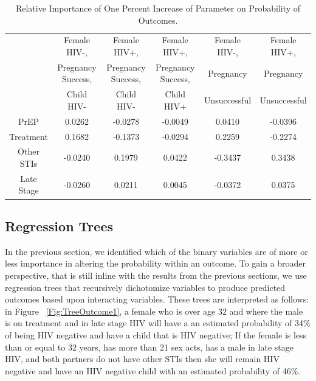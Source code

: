 \documentclass[11pt]{nih_mod}
\begin{document}
\begin{table}[H]	
\begin{center}
\begin{tabular}{|c|c|c|c|c|c|}
\hline
 & Female HIV-,  & Female HIV+, & Female HIV+, & Female HIV-, & Female HIV+,\\ 
 & Pregnancy Success,& Pregnancy Success,&Pregnancy Success,& Pregnancy& Pregnancy\\ 
 & Child HIV-&Child HIV-&Child HIV+&Unsuccessful&Unsuccessful\\ 
\hline
\hline
PrEP & 0.0262 & -0.0278 & -0.0049 & 0.0410 & -0.0396\\ 
Treatment & 0.1682 & -0.1373 & -0.0294 & 0.2259 & -0.2274\\
Other STIs &-0.0240 & 0.1979 & 0.0422 & -0.3437 & 0.3438\\
Late Stage & -0.0260 & 0.0211 & 0.0045 & -0.0372 & 0.0375\\
\hline
\end{tabular}
	\caption{Relative Importance of One Percent Increase of Parameter on Probability of Outcomes. \label{tab:OnePercentIncr}}
\end{center}
\end{table}


\subsection{Regression Trees}
In the previous section, we identified which of the binary variables are of more or less importance in altering the probability within an outcome.  To gain a broader perspective, that is still inline with the results from the previous sections, we use regression trees that recursively dichotomize variables to produce predicted outcomes based upon interacting variables.  These trees are interpreted as follows: in Figure ~\ref{Fig:TreeOutcome1}, a female who is over age 32 and where the male is on treatment and in late stage HIV will have a an estimated probability of 34\% of being HIV negative and have a child that is HIV negative; If the female is less than or equal to 32 years, has more than 21 sex acts, has a male in late stage HIV, and both partners do not have other STIs then she will remain HIV negative and have an HIV negative child with an estimated probability of 46\%.
\end{document}
